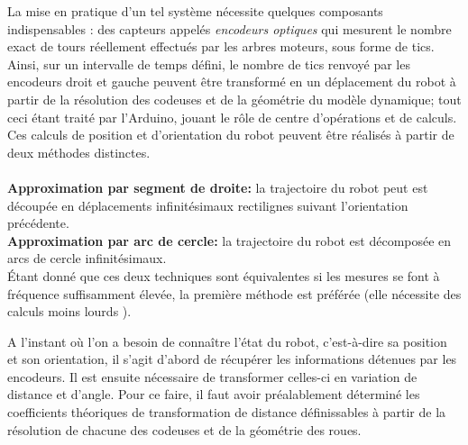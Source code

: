 \documentclass[a4paper,11pt]{article}
\begin{document}
La mise en pratique d'un tel système nécessite quelques composants indispensables : des capteurs appelés \textit{encodeurs optiques} qui mesurent le nombre exact de tours réellement effectués par les arbres moteurs, sous forme de tics. Ainsi, sur un intervalle de temps défini, le nombre de tics renvoyé par les encodeurs droit et gauche peuvent être transformé en un déplacement du robot à partir de la résolution des codeuses et de la géométrie du modèle dynamique; tout ceci étant traité par l'Arduino, jouant le rôle de centre d'opérations et de calculs. Ces calculs de position et d'orientation du robot peuvent être réalisés à partir de deux méthodes distinctes.\\\\
\textbf{Approximation par segment de droite:} la trajectoire du robot peut est découpée en déplacements infinitésimaux rectilignes suivant l'orientation précédente.\\
\textbf{Approximation par arc de cercle:} la trajectoire du robot est décomposée en arcs de cercle infinitésimaux.\\

Étant donné que ces deux techniques sont équivalentes si les mesures se font à fréquence suffisamment élevée, la première méthode est préférée (elle nécessite des calculs moins lourds \cite{noauthor_robotics:odometrie_2014}).

A l'instant où l'on a besoin de connaître l'état du robot, c'est-à-dire sa position et son orientation, il s'agit d'abord de récupérer les informations détenues par les encodeurs. Il est ensuite nécessaire de transformer celles-ci en variation de distance et d'angle. Pour ce faire, il faut avoir préalablement déterminé les coefficients théoriques de transformation de distance définissables à partir de la résolution de chacune des codeuses et de la géométrie des roues.
\end{document}
